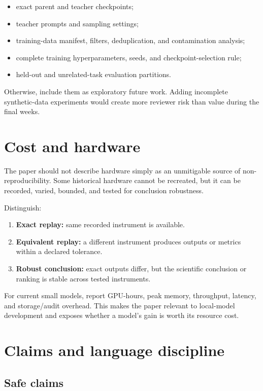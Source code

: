 \documentclass[11pt]{article}
\begin{document}
\begin{itemize}
  \item exact parent and teacher checkpoints;
  \item teacher prompts and sampling settings;
  \item training-data manifest, filters, deduplication, and contamination analysis;
  \item complete training hyperparameters, seeds, and checkpoint-selection rule;
  \item held-out and unrelated-task evaluation partitions.
\end{itemize}

Otherwise, include them as exploratory future work. Adding incomplete synthetic-data experiments would create more reviewer risk than value during the final weeks.

\section{Cost and hardware}

The paper should not describe hardware simply as an unmitigable source of non-reproducibility. Some historical hardware cannot be recreated, but it can be recorded, varied, bounded, and tested for conclusion robustness.

Distinguish:

\begin{enumerate}
  \item \textbf{Exact replay:} same recorded instrument is available.
  \item \textbf{Equivalent replay:} a different instrument produces outputs or metrics within a declared tolerance.
  \item \textbf{Robust conclusion:} exact outputs differ, but the scientific conclusion or ranking is stable across tested instruments.
\end{enumerate}

For current small models, report GPU-hours, peak memory, throughput, latency, and storage/audit overhead. This makes the paper relevant to local-model development and exposes whether a model's gain is worth its resource cost.

\section{Claims and language discipline}

\subsection{Safe claims}
\end{document}
